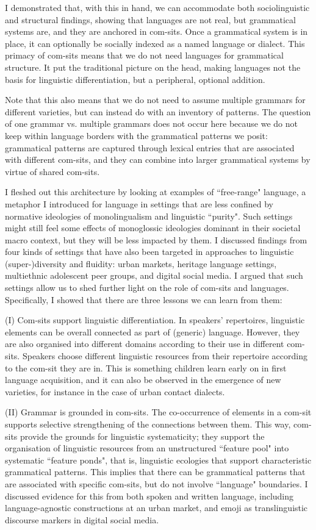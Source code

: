 I demonstrated that, with this in hand, we can accommodate both sociolinguistic and structural findings, showing that languages are not real, but grammatical systems are, and they are anchored in com-sits. Once a grammatical system is in place, it can optionally be socially indexed as a named language or dialect. This primacy of com-sits means that we do not need languages for grammatical structure. It put the traditional picture on the head, making languages not the basis for linguistic differentiation, but a peripheral, optional addition.

Note that this also means that we do not need to assume multiple grammars for different varieties, but can instead do with an inventory of patterns. The question of one grammar vs. multiple grammars does not occur here because we do not keep within language borders with the grammatical patterns we posit: grammatical patterns are captured through lexical entries that are associated with different com-sits, and they can combine into larger grammatical systems by virtue of shared com-sits.

I fleshed out this architecture by looking at examples of “free-range" language, a metaphor I introduced for language in settings that are less confined by normative ideologies of monolingualism and linguistic “purity". Such settings might still feel some effects of monoglossic ideologies dominant in their societal macro context, but they will be less impacted by them. I discussed findings from four kinds of settings that have also been targeted in approaches to linguistic (super\nobreakdash-)diversity and fluidity: urban markets, heritage language settings, multiethnic adolescent peer groups, and digital social media. I argued that such settings allow us to shed further light on the role of com-sits and languages. Specifically, I showed that there are three lessons we can learn from them:

(I) Com-sits support linguistic differentiation. In speakers’ repertoires, linguistic elements can be overall connected as part of (generic) language. However, they are also organised into different domains according to their use in different com-sits. Speakers choose different linguistic resources from their repertoire according to the com-sit they are in. This is something children learn early on in first language acquisition, and it can also be observed in the emergence of new varieties, for instance in the case of urban contact dialects.

(II) Grammar is grounded in com-sits. The co-occurrence of elements in a com-sit supports selective strengthening of the connections between them. This way, com-sits provide the grounds for linguistic systematicity; they support the organisation of linguistic resources from an unstructured “feature pool" into systematic “feature ponds", that is, linguistic ecologies that support characteristic grammatical patterns. This implies that there can be grammatical patterns that are associated with specific com-sits, but do not involve “language" boundaries. I discussed evidence for this from both spoken and written language, including language-agnostic constructions at an urban market, and emoji as translinguistic discourse markers in digital social media.

